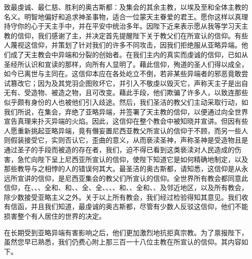 致最虔诚、最仁慈、胜利的奥古斯都：及集会的其余主教，以埃及至和全体主教的名义。明智地偏好和追求神圣事物，适合一位蒙天主眷爱的君王。愿你这样以真理持守你的心于天主手中，并在平安中统治多年。因陛下近来表示愿从我等学习天主教的信仰，我们感谢了主，并决定首先提醒陛下关于教父们在所宣认的信仰。有些人蔑视这信仰，并策划了针对我们的许多不同攻击，因我们拒绝服从亚略异端。他们成了天主教会中异端和分裂的创始者。在我们主内的真实而虔诚的信仰，已如从圣经所认识和宣读的那样，向所有人显明了。藉此信仰，殉道的圣人们得以成全，如今已离世与主同在。这信仰本应在各处屹立不倒，若非某些异端者的邪恶竟敢尝试篡改它；因为及其党羽企图败坏它，并引入不敬虔以毁灭它，声称天主子是出自无有、受造物、被造之物，且可改变。藉此手段，他们欺骗了许多人，以致连那些似乎颇有身份的人也被他们引入歧途。然后，我们圣洁的教父们主动采取行动，如我们所说，在集会，弃绝了亚略异端，并签署了天主教的信仰，以便通过向全世界宣告真理来扑灭异端的火焰。因此，这信仰在整个教会中被知晓并宣讲。但因有些人愿重新挑起亚略异端，竟有僭妄置尼西亚教父所宣认的信仰于不顾，而另一些人则假装接受它，实则否认它，歪曲的意义，从而亵渎圣神，声称圣神是受造物且是通过圣子的手段而被造的存在者，我们，迫不得已看到这类亵渎对人民造成的伤害，急忙向陛下呈上尼西亚所宣认的信仰，使陛下知道它是如何精确地制定，以及那些教导与之相悖的人的错误何其大。最圣洁的奥古斯都，请知悉，这信仰是从永远所宣讲的信仰，是尼西亚集会的教父们所宣认的信仰。全世界所有教会都同意此信仰，在、、、全和、和、、全、全、、、、和、、全和、、及邻近地区，以及所有教会，除少数接受亚略主义之外。关于以上所有教会，我们经过检验得知其意见。我们收有信函，并且我们知道，最虔诚的奥古斯都，尽管有少数人反驳这信仰，他们不能损害整个有人居住的世界的决定。\par

在长期受到亚略异端有害影响之后，他们更加激烈地抗拒真宗教。为了禀报陛下，虽然您早已熟悉，我们仍费心附上那三百一十八位主教在所宣认的信仰。其内容如下。\par

